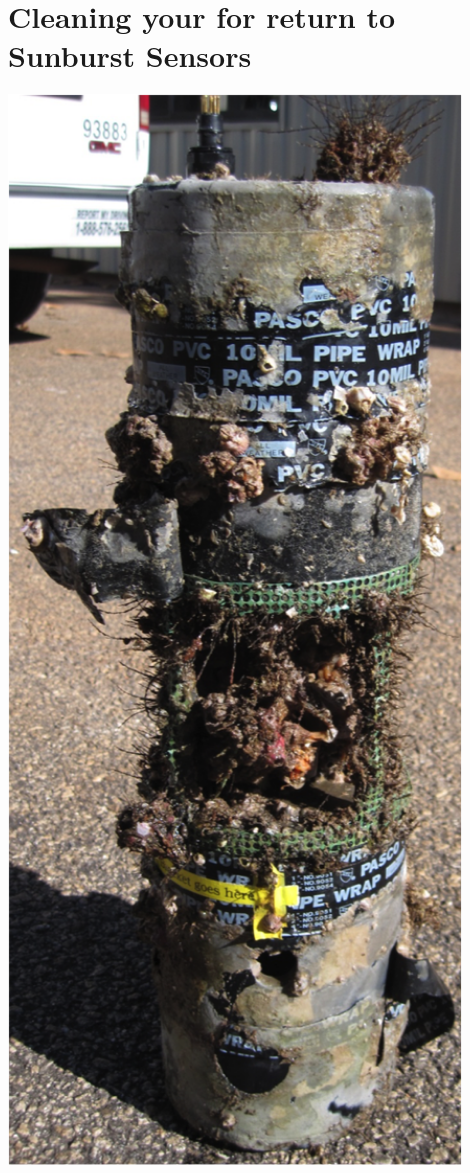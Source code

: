 \section{Cleaning your \instType{} for return to Sunburst Sensors}

\noindent
\begin{minipage}[t]{0.5\textwidth}
\centering
\raisebox{\dimexpr \topskip-\height}
{
   \includegraphics[width=0.9\textwidth]{figs/Foul.png}
}
\end{minipage}

